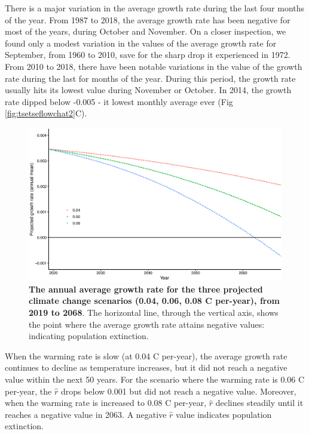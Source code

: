 \documentclass[10pt,a4paper]{article}
\begin{document}
\newpage
There is a major variation in the average growth rate during the last four months of the year. From 1987 to 2018, the average growth rate has been negative for most of the years, during October and November. On a closer inspection, we found only a modest variation in the values of the average growth rate for September, from 1960 to 2010, save for the sharp drop it experienced in 1972. From 2010 to 2018, there have been notable variations in the value of the growth rate during the last for months of the year. During this period, the growth rate usually hits its lowest value during November or October.  In 2014, the growth rate dipped below -0.005 - it lowest monthly average ever (Fig \ref{fig:tsetseflowchat2}C). 



\begin{figure}[h]
	\centering
	\includegraphics[width=0.8\linewidth]{Projected_growthRateDec12}
	\caption{{\bf The annual average growth rate for the three projected climate change scenarios (0.04, 0.06, 0.08 \degree C per-year), from 2019  to 2068}. The horizontal line, through the vertical axis, shows the point where the average growth rate attains negative values: indicating population extinction.}
	\label{fig:tsetseflowchat4}
\end{figure}

When the warming rate is slow (at 0.04 \degree C per-year), the average growth rate continues to decline as temperature increases, but it did not reach a negative value within the next 50 years. For the scenario where the warming rate is  0.06 \degree C per-year, the $\hat{r}$ drops below 0.001 but did not reach a negative value. Moreover, when the warming rate is increased to  0.08 \degree C per-year, $\hat{r}$ declines steadily until it reaches a negative value in 2063. A negative $\hat{r}$ value indicates population extinction. 
 
\end{document}
